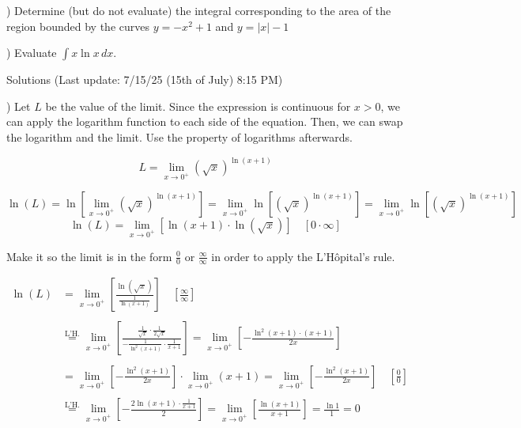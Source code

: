 \documentclass{article}
\begin{document}
) Determine (but do not evaluate) the integral corresponding to the area of the region bounded by the curves $y = -x^2 + 1$ and $y = |x|- 1$

\hfill

) Evaluate $\displaystyle \int x\ln x \, dx$.

\hfill

\newpage

\begin{center}
Solutions (Last update: 7/15/25 (15th of July) 8:15 PM)
\end{center}

) Let $L$ be the value of the limit. Since the expression is continuous for $x>0$, we can apply the logarithm function to each side of the equation. Then, we can swap the logarithm and the limit. Use the property of logarithms afterwards.

\begin{equation*}L=\lim_{x\to0^+} \left(\sqrt x\right)^{\ln\left(x+1\right)}\end{equation*}

\begin{equation*}\ln(L)=\ln\left[\lim_{x\to0^+} \left(\sqrt x\right)^{\ln\left(x+1\right)}\right] = \lim_{x\to0^+} \ln\left[\left(\sqrt x\right)^{\ln\left(x+1\right)}\right] = \lim_{x\to0^+} \ln\left[\left(\sqrt x\right)^{\ln\left(x+1\right)}\right] \end{equation*}
\begin{equation*}\ln\left(L\right) = \lim_{x\to0^+} \left[\ln\left(x+1\right)\cdot\ln\left(\sqrt x\right)\right] \quad\left[0\cdot\infty\right]\end{equation*}

\hfill

\noindent Make it so the limit is in the form $\displaystyle \frac00$ or $\displaystyle \frac\infty\infty$ in order to apply the L'Hôpital's rule.

\begin{align*}\ln\left(L\right) &= \lim_{x\to0^+} \left[\frac{\ln\left(\sqrt x\right)}{\frac1{\ln\left(x+1\right)}}\right] \quad\left[\frac\infty\infty\right]\\\\&\overset{\text{L'H.}}{=}\lim_{x\to0^+} \left[\frac{\frac1{\sqrt x}\cdot\frac1{2\sqrt x}}{-\frac1{\ln^2\left(x+1\right)}\cdot \frac1{x+1}}\right] = \lim_{x\to0^+} \left[-\frac{\ln^2(x+1)\cdot(x+1)}{2x}\right]\\\\&=\lim_{x\to0^+} \left[-\frac{\ln^2(x+1)}{2x}\right] \cdot\lim_{x\to0^+} \left(x+1\right)=\lim_{x\to0^+} \left[-\frac{\ln^2(x+1)}{2x}\right]\quad\left[\frac00\right]\\\\&\overset{\text{L'H.}}{=}\lim_{x\to0^+} \left[-\frac{2\ln(x+1) \cdot\frac1{x+1}}2\right]=\lim_{x\to0^+} \left[\frac{\ln(x+1)}{x+1}\right] = \frac{\ln1}{1}=0\end{align*}
\end{document}
